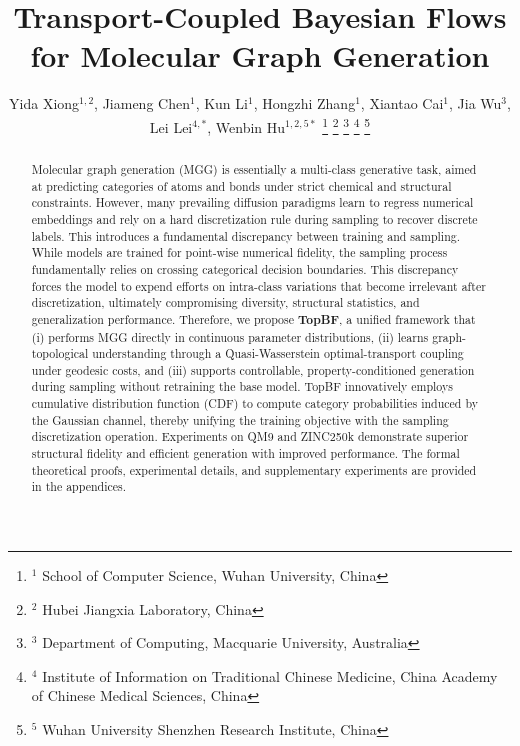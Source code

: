 \documentclass[journal,twoside,web]{ieeecolor}
\begin{document}
\title{Transport-Coupled Bayesian Flows for Molecular Graph Generation}
\author{
    Yida Xiong$^{1,2}$, Jiameng Chen$^1$, Kun Li$^1$, Hongzhi Zhang$^1$, Xiantao Cai$^1$, Jia Wu$^3$, Lei Lei$^{4,\ast}$, Wenbin Hu$^{1,2,5\ast}$
    \thanks{$^1$ School of Computer Science, Wuhan University, China}
    \thanks{$^2$ Hubei Jiangxia Laboratory, China}
    \thanks{$^3$ Department of Computing, Macquarie University, Australia}
    \thanks{$^4$ Institute of Information on Traditional Chinese Medicine, China Academy of Chinese Medical Sciences, China}
    \thanks{$^5$ Wuhan University Shenzhen Research Institute, China}
}


\maketitle

\begin{abstract}
    Molecular graph generation (MGG) is essentially a multi-class generative task, aimed at predicting categories of atoms and bonds under strict chemical and structural constraints. However, many prevailing diffusion paradigms learn to regress numerical embeddings and rely on a hard discretization rule during sampling to recover discrete labels. This introduces a fundamental discrepancy between training and sampling. While models are trained for point-wise numerical fidelity, the sampling process fundamentally relies on crossing categorical decision boundaries. This discrepancy forces the model to expend efforts on intra-class variations that become irrelevant after discretization, ultimately compromising diversity, structural statistics, and generalization performance. Therefore, we propose \textbf{TopBF}, a unified framework that (i) performs MGG directly in continuous parameter distributions, (ii) learns graph-topological understanding through a Quasi-Wasserstein optimal-transport coupling under geodesic costs, and (iii) supports controllable, property-conditioned generation during sampling without retraining the base model. TopBF innovatively employs cumulative distribution function (CDF) to compute category probabilities induced by the Gaussian channel, thereby unifying the training objective with the sampling discretization operation. Experiments on QM9 and ZINC250k demonstrate superior structural fidelity and efficient generation with improved performance. The formal theoretical proofs, experimental details, and supplementary experiments are provided in the appendices.
\end{abstract}
\end{document}
